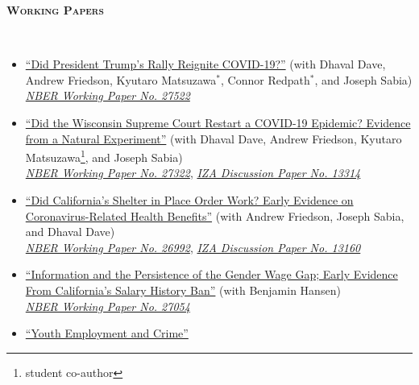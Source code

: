 \documentclass[11pt,english]{article}
\renewcommand{\section}[2]{
        \pagebreak[3]%
        \vspace{1.0\baselineskip}%
        \phantomsection\addcontentsline{toc}{section}{#1}%
        \hspace{0in}%
        {\raggedright \scshape \large \textbf{#1}}%
        \vspace{0.25\baselineskip}#2
}
\begin{document}
\section{Working Papers}\\
\vspace*{-.7cm}
\begin{itemize}[label={},itemindent=-2em,leftmargin=2em]

  \item \href{https://cheps.sdsu.edu/docs/CHEPS-Working-Paper-Tulsa-Rally-Jul-9-2020.pdf}{``Did President Trump's Rally Reignite COVID-19?''} (with Dhaval Dave, Andrew Friedson, Kyutaro Matsuzawa$^*$, Connor Redpath$^*$, and Joseph Sabia)%
  \\ \href{https://www.nber.org/papers/w27522}{\emph{ NBER Working Paper No. 27522}}


 \item \href{https://cheps.sdsu.edu/docs/Did-Wisconsin-Supreme-Court-Restart-an-Epidemic-CHEPS-Working-Paper-5-28-20.pdf}{``Did the Wisconsin Supreme Court Restart a COVID-19 Epidemic? Evidence from a Natural Experiment''} (with Dhaval Dave, Andrew Friedson, Kyutaro Matsuzawa\footnote{student co-author}, and Joseph Sabia)%
 \\ \href{https://www.nber.org/papers/w27322}{\emph{ NBER Working Paper No. 27322}}, \href{https://www.iza.org/publications/dp/13314/did-the-wisconsin-supreme-court-restart-a-covid-19-epidemic-evidence-from-a-natural-experiment}{\emph{ IZA Discussion Paper No. 13314}}

 \item\href{https://cheps.sdsu.edu/docs/CHEPS_Working_Paper_No_2020401_FSMD_April_10_2020.pdf}{``Did California's Shelter in Place Order Work? Early Evidence on Coronavirus-Related Health Benefits''} (with Andrew Friedson, Joseph Sabia, and Dhaval Dave) \\
  \href{https://www.nber.org/papers/w26992}{\emph{ NBER Working Paper No. 26992}},
  \href{https://www.iza.org/publications/dp/13160/did-californias-shelter-in-place-order-work-early-coronavirus-related-public-health-effects}{\emph{ IZA Discussion Paper No. 13160}}

  \item\href{https://drewmcnichols.github.io/salary_history_ban.pdf}{``Information and the Persistence of the Gender Wage Gap; Early Evidence From California's Salary History Ban''} (with Benjamin Hansen) \\
    \href{https://www.nber.org/papers/w27054}{\emph{ NBER Working Paper No. 27054}}
\item \href{https://drewmcnichols.github.io/youth_employment_and_crime.pdf}{``Youth Employment and Crime''}  \\
\end{itemize}
\vspace*{-1cm}
\end{document}
